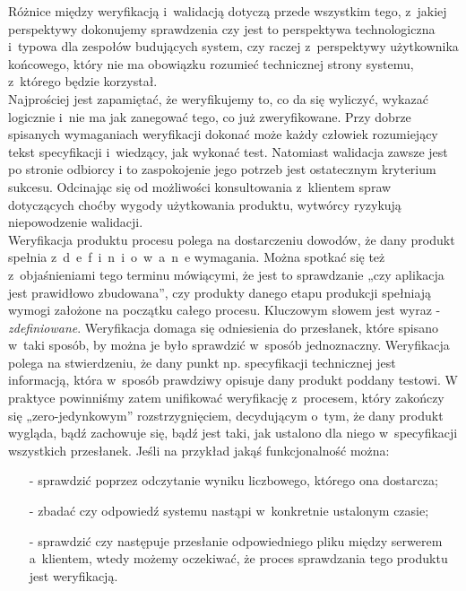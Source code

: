 \documentclass{xmgr}
\begin{document}
 \textcolor{sb}{Różnice między weryfikacją i~walidacją dotyczą przede wszystkim tego, z~jakiej perspektywy dokonujemy sprawdzenia} \textcolor{sa}{czy jest to perspektywa technologiczna i~typowa dla zespołów budujących system, czy raczej z~perspektywy użytkownika końcowego, który nie ma obowiązku rozumieć technicznej strony systemu, z~którego będzie korzystał.}
\\
\indent \textcolor{sb}{Najprościej jest zapamiętać, że weryfikujemy to,} \textcolor{sa}{co da się wyliczyć, wykazać logicznie i~nie ma jak zanegować tego, co już zweryfikowane.} \textcolor{sb}{Przy dobrze spisanych wymaganiach} \textcolor{sa}{weryfikacji dokonać może każdy człowiek rozumiejący tekst specyfikacji i~wiedzący, jak wykonać test. }
\textcolor{sb}{Natomiast walidacja zawsze jest po stronie odbiorcy i} \textcolor{sa}{to zaspokojenie jego potrzeb jest ostatecznym kryterium sukcesu.} \textcolor{sb}{Odcinając się od możliwości konsultowania z~klientem spraw dotyczących choćby wygody użytkowania produktu,} \textcolor{sa}{wytwórcy ryzykują niepowodzenie walidacji.}
\\
\indent \textcolor{sb}{Weryfikacja produktu procesu} \textcolor{sa}{polega na dostarczeniu dowodów, że dany produkt spełnia z~d~e~f~i~n~i~o~w~a~n~e wymagania.} \textcolor{sb}{Można spotkać się też z~objaśnieniami tego terminu mówiącymi, że} \textcolor{sa}{jest to sprawdzanie „czy aplikacja jest prawidłowo zbudowana”, czy produkty danego etapu produkcji spełniają wymogi założone na początku całego procesu.}
\textcolor{sb}{Kluczowym słowem jest wyraz -  \textit{zdefiniowane}.} \textcolor{sa}{Weryfikacja domaga się odniesienia do przesłanek, które spisano w~taki sposób, by można je było sprawdzić w~sposób jednoznaczny.} \textcolor{sb}{Weryfikacja polega na stwierdzeniu, że dany punkt np. specyfikacji technicznej jest informacją,} \textcolor{sa}{która w~sposób prawdziwy opisuje dany produkt poddany testowi.} \textcolor{sb}{W praktyce powinniśmy zatem unifikować weryfikację z~procesem, który zakończy się „zero-jedynkowym” rozstrzygnięciem,} \textcolor{sa}{decydującym o~tym, że dany produkt wygląda, bądź zachowuje się, bądź jest taki, jak ustalono dla niego w~specyfikacji wszystkich przesłanek.} \textcolor{sb}{Jeśli na przykład jakąś funkcjonalność można:}
\begin{itemize}
  \item[-] \textcolor{sa}{sprawdzić poprzez odczytanie wyniku liczbowego, którego ona dostarcza; }
  \item[-] \textcolor{sa}{zbadać czy odpowiedź systemu nastąpi w~konkretnie ustalonym czasie;}
  \item[-] \textcolor{sa}{sprawdzić czy następuje przesłanie odpowiedniego pliku między serwerem a~klientem,
wtedy możemy oczekiwać, że proces sprawdzania tego produktu jest weryfikacją.}
\end{itemize}
\end{document}
